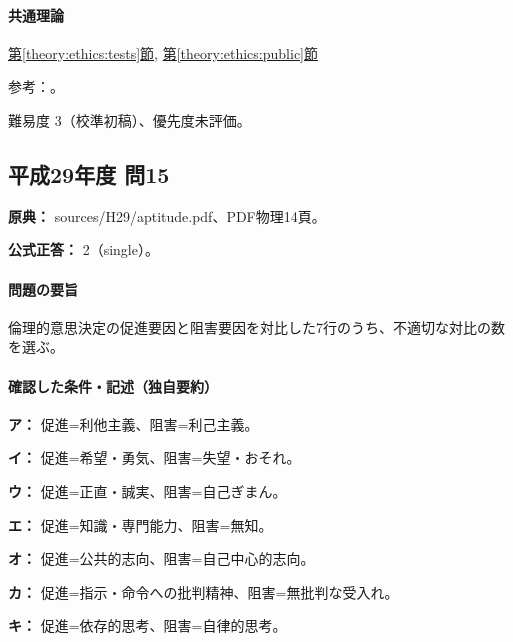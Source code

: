 \paragraph{共通理論} \hyperref[theory:ethics:tests]{第\ref*{theory:ethics:tests}節}, \hyperref[theory:ethics:public]{第\ref*{theory:ethics:public}節}

\par 参考：\cite{davis_seven_steps,ipej_ethics2011}。

\par 難易度 3（校準初稿）、優先度未評価。

\subsection{平成29年度 問15}
\label{q:h29-reg-apt-15}

\noindent\textbf{原典：} sources/H29/aptitude.pdf、PDF物理14頁。

\textbf{公式正答：} 2（single）。

\paragraph{問題の要旨} 倫理的意思決定の促進要因と阻害要因を対比した7行のうち、不適切な対比の数を選ぶ。

\paragraph{確認した条件・記述（独自要約）}\mbox{}\par

\noindent\textbf{ア：} 促進=利他主義、阻害=利己主義。\par

\noindent\textbf{イ：} 促進=希望・勇気、阻害=失望・おそれ。\par

\noindent\textbf{ウ：} 促進=正直・誠実、阻害=自己ぎまん。\par

\noindent\textbf{エ：} 促進=知識・専門能力、阻害=無知。\par

\noindent\textbf{オ：} 促進=公共的志向、阻害=自己中心的志向。\par

\noindent\textbf{カ：} 促進=指示・命令への批判精神、阻害=無批判な受入れ。\par

\noindent\textbf{キ：} 促進=依存的思考、阻害=自律的思考。\par

